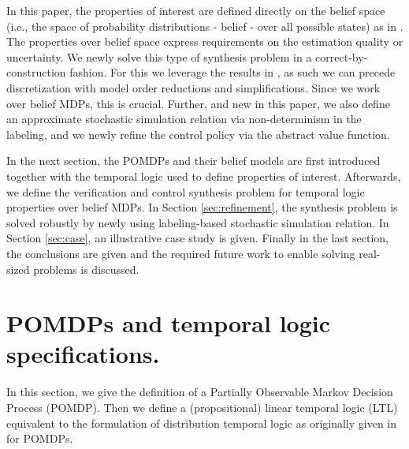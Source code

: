 \documentclass{ifacconf}
\begin{document}
In this paper, the properties of interest are defined directly on the belief space (i.e., the space of probability distributions - belief - over all possible states) as in \citep{Vasile2016,JonesDTL2013}. The properties over belief space express requirements on the estimation quality or uncertainty. 
We newly solve this type of synthesis problem in a correct-by-construction fashion.  For this we leverage the results in \citep{haesaert2017verification, tech_report_TACAS}, as such we can precede  discretization %
with model order reductions and simplifications.  Since we work over belief MDPs, this is crucial.  Further, and new in this paper, we also define an approximate stochastic simulation relation via non-determinism in the labeling, and we newly refine the control policy via the abstract value function.

 
  
 In the next section, the POMDPs and their belief models are first introduced together with the temporal logic used to define properties of interest. 
 Afterwards, we define the verification and control synthesis  problem for temporal logic properties over belief MDPs. 
 In Section \ref{sec:refinement}, the synthesis problem is solved robustly by newly using labeling-based stochastic simulation relation. In Section \ref{sec:case}, an illustrative case study is given. 
Finally in the last section, the conclusions are given and the required future work to enable solving real-sized problems is discussed.
 
\section{POMDPs and temporal logic specifications.}

In this section, we give the definition of a Partially Observable Markov Decision Process (POMDP). Then we define a (propositional) linear temporal logic (LTL)  equivalent to the formulation of distribution temporal logic as originally given in \citep{JonesDTL2013} for POMDPs. 
\end{document}
